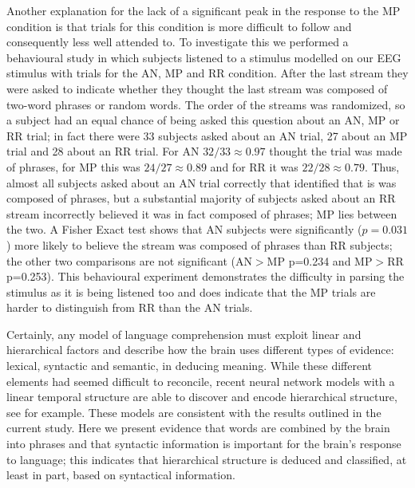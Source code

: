 \documentclass[10pt,letterpaper]{article}
\newcommand{\citet}[1]{\cite{#1}}
\begin{document}

Another explanation for the lack of a significant peak in the response
to the MP condition is that trials for this condition is more
difficult to follow and consequently less well attended to. To
investigate this we performed a behavioural study in which subjects
listened to a stimulus modelled on our EEG stimulus with trials for
the AN, MP and RR condition. After the last stream they were asked to
indicate whether they thought the last stream was composed of two-word
phrases or random words. The order of the streams was randomized, so
a subject had an equal chance of being asked this question about an
AN, MP or RR trial; in fact there were 33 subjects asked about an AN
trial, 27 about an MP trial and 28 about an RR trial. For AN
$32/33\approx 0.97$ thought the trial was made of phrases, for MP this
was $24/27\approx 0.89$ and for RR it was $22/28\approx 0.79$. Thus,
almost all subjects asked about an AN trial correctly that identified
that is was composed of phrases, but a substantial majority of
subjects asked about an RR stream incorrectly believed it was in fact
composed of phrases; MP lies between the two. A Fisher Exact test
shows that AN subjects were significantly ($p=0.031$) more likely to
believe the stream was composed of phrases than RR subjects; the other
two comparisons are not significant (AN$>$MP p=0.234 and MP$>$RR
p=0.253). This behavioural experiment demonstrates the difficulty in
parsing the stimulus as it is being listened too and does indicate
that the MP trials are harder to distinguish from RR than the AN
trials.


Certainly, any model of language comprehension must exploit linear and
hierarchical factors and describe how the brain uses different types
of evidence: lexical, syntactic and semantic, in deducing
meaning. While these different elements had seemed difficult to
reconcile, recent neural network models with a linear temporal
structure are able to discover and encode hierarchical structure, see
\citet{LakretzEtAl2019,Baroni2019} for example. These models are
consistent with the results outlined in the current study. Here we
present evidence that words are combined by the brain into phrases and
that syntactic information is important for the brain's response to
language; this indicates that hierarchical structure is deduced and
classified, at least in part, based on syntactical information.
\end{document}

